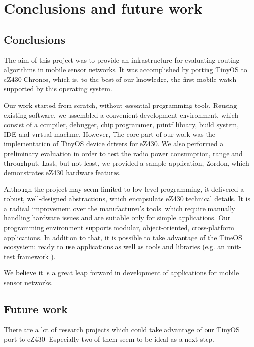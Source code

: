 \chapter{Conclusions and future work}

\section{Conclusions}


The aim of this project was to provide an infrastructure for evaluating routing algorithms in mobile sensor networks.
It was accomplished by porting TinyOS to eZ430 Chronos, which is, to the best of our knowledge, the first mobile watch supported by this operating system.

Our work started from scratch, without essential programming tools.
Reusing existing software, we assembled a convenient development environment, which consist of a compiler, debugger, chip programmer, printf library, build system, IDE and virtual machine.
However, The core part of our work was the implementation of TinyOS device drivers for eZ430.
We also performed a preliminary evaluation in order to test the radio power consumption, range and throughput.
Last, but not least, we provided a sample application, Zordon, which demonstrates eZ430 hardware features.

Although the project may seem limited to low-level programming, it delivered a robust, well-designed abstractions, which encapsulate eZ430 technical details.
It is a radical improvement over the manufacturer's tools, which require manually handling hardware issues and are suitable only for simple applications.
Our programming environment supports modular, object-oriented, cross-platform applications.
In addition to that, it is possible to take advantage of the TineOS ecosystem:
ready to use applications as well as tools and libraries (e.g. an unit-test framework \cite{TOSMock}).

We believe it is a great leap forward in development of applications for mobile sensor networks.


\section{Future work}
There are a lot of research projects which could take advantage of our TinyOS port to eZ430.
Especially two of them seem to be ideal as a next step.

